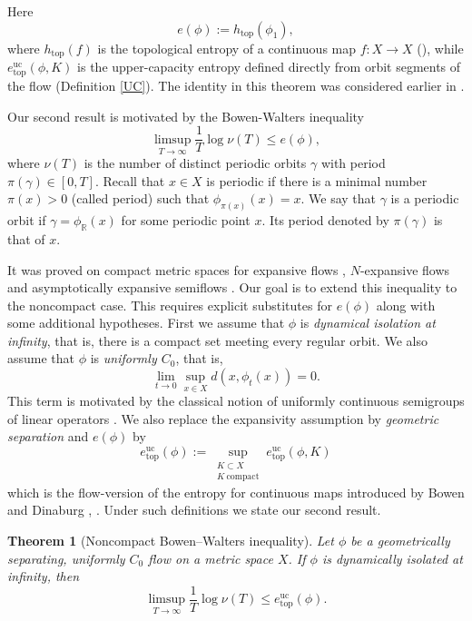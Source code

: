 \documentclass[11pt,reqno]{amsart}
\newtheorem{theorem}{Theorem}[section]
\theoremstyle{definition}
\theoremstyle{remark}
\newcommand{\htop}{h_{\mathrm{top}}}
\newcommand{\hE}{e^{\mathrm{uc}}_{\mathrm{top}}}
\begin{document}
Here
\[
 e(\phi):=\htop(\phi_1),
\]
where $\htop(f)$ is the topological entropy of a continuous map $f:X\to X$ (\cite{akm}), while $\hE(\phi,K)$ is the upper-capacity entropy defined directly from orbit segments of the
flow (Definition \ref{UC}).
The identity in this theorem was considered earlier in \cite{rwy}.



Our second result is motivated by the Bowen-Walters inequality
$$
\limsup_{T\to\infty}\frac{1}T\log\nu(T)\leq e(\phi),
$$
where $\nu(T)$ is the number of distinct periodic orbits $\gamma$ with period $\pi(\gamma)\in [0,T]$.
Recall that $x\in X$ is periodic if there is a minimal number $\pi(x)>0$ (called period) such that $\phi_{\pi(x)}(x)=x$. We say that $\gamma$ is a periodic orbit if $\gamma=\phi_\mathbb{R}(x)$ for some periodic point $x$. Its period denoted by $\pi(\gamma)$ is that of $x$.

It was proved on compact metric spaces for expansive flows \cite{bw}, $N$-expansive flows \cite{lms} and asymptotically expansive semiflows \cite{lr}.
Our goal is to extend this inequality to the noncompact case.
This requires explicit substitutes for $e(\phi)$ along with some additional hypotheses.
First we assume that $\phi$ is {\em dynamical isolation at infinity}, that is, there is a compact set meeting every regular orbit.  We also assume that $\phi$ is {\em uniformly $C_0$}, that is,
\[
 \lim_{t\to0}\sup_{x\in X}d(x,\phi_t(x))=0.
\]
This term is motivated by the classical notion of uniformly continuous semigroups of linear operators \cite{p}.
We also replace the
expansivity assumption by {\em geometric separation} \cite{a} and $e(\phi)$ by
\[
 \hE(\phi)
 :=\sup_{\substack{K\subset X\\K\ \mathrm{compact}}}
 \hE(\phi,K)
\]
which is the flow-version of the entropy for continuous maps introduced by Bowen and Dinaburg \cite{b1}, \cite{di}.
Under such definitions we state our second result.

\begin{theorem}[Noncompact Bowen--Walters inequality]
\label{thmB}
Let $\phi$ be a geometrically separating, uniformly $C_0$ flow on a metric
space $X$.  If $\phi$ is dynamically isolated at infinity, then
\begin{equation}
\label{pelus}
 \limsup_{T\to\infty}\frac1T\log\nu(T)
 \leq \hE(\phi).
\end{equation}
\end{theorem}
\end{document}
